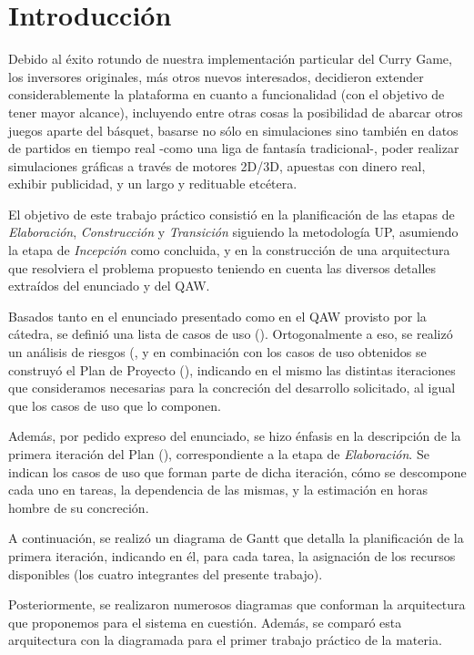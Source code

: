 \section{Introducción}
Debido al éxito rotundo de nuestra implementación particular del Curry Game, los inversores originales, más otros nuevos interesados, decidieron extender considerablemente la plataforma en cuanto a funcionalidad (con el objetivo de tener mayor alcance), incluyendo entre otras cosas la posibilidad de abarcar otros juegos aparte del básquet, basarse no sólo en simulaciones sino también en datos de partidos en tiempo real -como una liga de fantasía tradicional-, poder realizar simulaciones gráficas a través de motores 2D/3D, apuestas con dinero real, exhibir publicidad, y un largo y redituable etcétera.

El objetivo de este trabajo práctico consistió en la planificación de las etapas de \emph{Elaboración}, \emph{Construcción} y \emph{Transición} siguiendo la metodología UP, asumiendo la etapa de \emph{Incepción} como concluida, y en la construcción de una arquitectura que resolviera el problema propuesto teniendo en cuenta las diversos detalles extraídos del enunciado y del QAW.

Basados tanto en el enunciado presentado como en el QAW provisto por la cátedra, se definió una lista de casos de uso (). Ortogonalmente a eso, se realizó un análisis de riesgos (, y en combinación con los casos de uso obtenidos se construyó el Plan de Proyecto (), indicando en el mismo las distintas iteraciones que consideramos necesarias para la concreción del desarrollo solicitado, al igual que los casos de uso que lo componen.

Además, por pedido expreso del enunciado, se hizo énfasis en la descripción de la primera iteración del Plan (), correspondiente a la etapa de \emph{Elaboración}. Se indican los casos de uso que forman parte de dicha iteración, cómo se descompone cada uno en tareas, la dependencia de las mismas, y la estimación en horas hombre de su concreción.

A continuación, se realizó un diagrama de Gantt que detalla la planificación de la primera iteración, indicando en él, para cada tarea, la asignación de los recursos disponibles (los cuatro integrantes del presente trabajo).

Posteriormente, se realizaron numerosos diagramas que conforman la arquitectura que proponemos para el sistema en cuestión. Además, se comparó esta arquitectura con la diagramada para el primer trabajo práctico de la materia.
